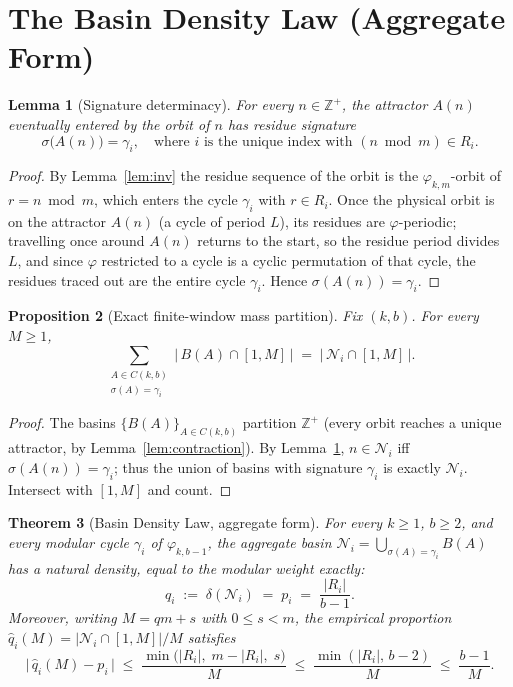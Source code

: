 \documentclass[11pt]{article}
\newtheorem{theorem}{Theorem}[section]
\newtheorem{lemma}[theorem]{Lemma}
\newtheorem{proposition}[theorem]{Proposition}
\theoremstyle{definition}
\theoremstyle{remark}
\begin{document}
\section{The Basin Density Law (Aggregate Form)}\label{sec:bdl}

\begin{lemma}[Signature determinacy]\label{lem:sig}
For every $n \in \mathbb{Z}^+$, the attractor $A(n)$ eventually entered by the orbit of $n$ has residue signature
\[
\sigma\big(A(n)\big) = \gamma_i, \quad \text{where } i \text{ is the unique index with } (n \bmod m) \in R_i.
\]
\end{lemma}

\begin{proof}
By Lemma~\ref{lem:inv} the residue sequence of the orbit is the $\varphi_{k,m}$-orbit of $r = n \bmod m$, which enters the cycle $\gamma_i$ with $r \in R_i$. Once the physical orbit is on the attractor $A(n)$ (a cycle of period $L$), its residues are $\varphi$-periodic; travelling once around $A(n)$ returns to the start, so the residue period divides $L$, and since $\varphi$ restricted to a cycle is a cyclic permutation of that cycle, the residues traced out are the entire cycle $\gamma_i$. Hence $\sigma(A(n)) = \gamma_i$.
\end{proof}

\begin{proposition}[Exact finite-window mass partition]\label{prop:partition}
Fix $(k,b)$. For every $M \ge 1$,
\[
\sum_{\substack{A \in C(k,b) \\ \sigma(A) = \gamma_i}} \big|\, B(A) \cap [1,M] \,\big| \;=\; \big|\, \mathcal{N}_i \cap [1,M] \,\big|.
\]
\end{proposition}

\begin{proof}
The basins $\{B(A)\}_{A \in C(k,b)}$ partition $\mathbb{Z}^+$ (every orbit reaches a unique attractor, by Lemma~\ref{lem:contraction}). By Lemma~\ref{lem:sig}, $n \in \mathcal{N}_i$ iff $\sigma(A(n)) = \gamma_i$; thus the union of basins with signature $\gamma_i$ is exactly $\mathcal{N}_i$. Intersect with $[1,M]$ and count.
\end{proof}

\begin{theorem}[Basin Density Law, aggregate form]\label{thm:bdl}
For every $k \ge 1$, $b \ge 2$, and every modular cycle $\gamma_i$ of $\varphi_{k,b-1}$, the aggregate basin $\mathcal{N}_i = \bigcup_{\sigma(A) = \gamma_i} B(A)$ has a natural density, equal to the modular weight exactly:
\[
q_i \;:=\; \delta(\mathcal{N}_i) \;=\; p_i \;=\; \frac{|R_i|}{b-1}.
\]
Moreover, writing $M = qm + s$ with $0 \le s < m$, the empirical proportion $\hat q_i(M) = |\mathcal{N}_i \cap [1,M]|/M$ satisfies
\[
\big|\, \hat q_i(M) - p_i \,\big| \;\le\; \frac{\min\big(|R_i|,\; m-|R_i|,\; s\big)}{M} \;\le\; \frac{\min(|R_i|,\, b-2)}{M} \;\le\; \frac{b-1}{M}.
\]
\end{theorem}
\end{document}

